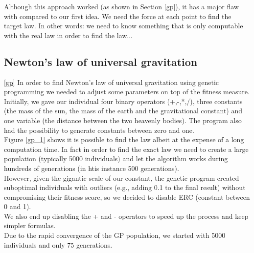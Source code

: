 Although this approach worked (as shown in Section \ref{gp}), it
has a major flaw with compared to our first idea. We need the force at each
point to find
the target law. In other words: we need to know something that is only
computable with the
real law in order to find the law...\\

\subsection{Newton's law of universal gravitation}
\ref{gp}
In order to find Newton's law of universal gravitation using genetic
programming we needed to adjust some parameters on top of the fitness
measure.\\

Initially, we gave our individual four binary operators (+,-,*,/), three
constants (the mass of the sun, the mass of the earth and the gravitational
constant) and
one variable (the distance between the two heavenly bodies). The program also
had the possibility to generate constants between zero and one.\\

Figure \ref{gp_1} shows it is possible to find the law albeit at the expense of
a long computation time. In fact in order to find the exact law we need to
create a large population (typically 5000 individuals) and let the algorithm
works during hundreds of generations (in htis instance 500 generations).\\

However, given the
gigantic scale of our constant, the genetic program created suboptimal individuals with outliers
(e.g., adding 0.1 to the final result) without compromising their fitness
score, so we decided to disable ERC (constant between 0 and 1).\\
We also end up disabling the + and - operators to speed up the process and keep
simpler formulas.\\

Due to the rapid convergence of the GP population, we started with 5000
individuals and only 75 generations.\\

